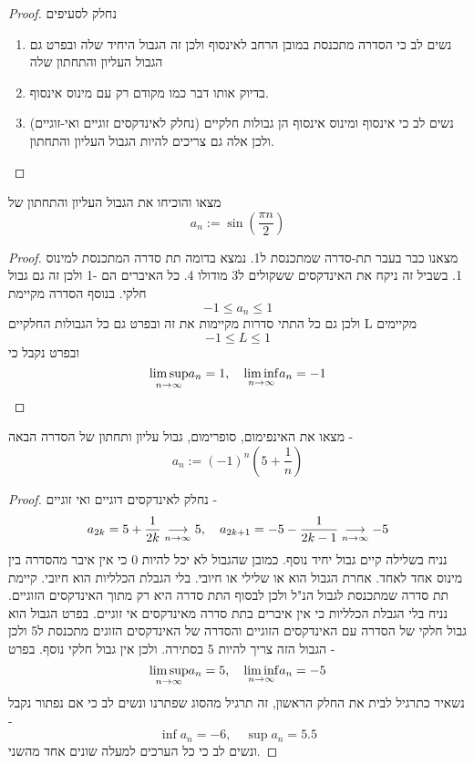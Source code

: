\documentclass{article}
\begin{document}
\begin{proof}
נחלק לסעיפים
\newline
\begin{enumerate}
\item נשים לב כי הסדרה מתכנסת במובן הרחב לאינסוף ולכן זה הגבול היחיד שלה ובפרט גם הגבול העליון והתחתון שלה
\item בדיוק אותו דבר כמו מקודם רק עם מינוס אינסוף.
\item נשים לב כי אינסוף ומינוס אינסוף הן גבולות חלקיים (נחלק לאינדקסים זוגיים ואי-זוגיים) ולכן אלה גם צריכים להיות הגבול העליון והתחתון. 
\end{enumerate}
\end{proof}

\begin{exercise}
מצאו והוכיחו את הגבול העליון והתחתון של 
\[a_n:=\sin\left(\frac{\pi n}{2}\right)\]
\end{exercise}

\begin{proof}
מצאנו כבר בעבר תת-סדרה שמתכנסת ל1. נמצא בדומה תת סדרה המתכנסת למינוס 1. בשביל זה ניקח את האינדקסים ששקולים ל3 מודולו 4. כל האיברים הם -1 ולכן זה גם גבול חלקי. בנוסף הסדרה מקיימת
\[-1\leq a_n\leq 1\]
ולכן גם כל התתי סדרות מקיימות את זה ובפרט גם כל הגבולות החלקיים L מקיימים 
\[-1\leq L\leq 1\]
ובפרט נקבל כי
\[\underset{n\rightarrow\infty}{\limsup} a_n = 1,\quad \underset{n\rightarrow\infty}{\liminf} a_n = -1\]
\end{proof}

\begin{exercise}
מצאו את האינפימום, סופרימום, גבול עליון ותחתון של הסדרה הבאה -
\[a_n:=(-1)^n \left(5+\frac{1}{n}\right)\]
\end{exercise}

\begin{proof}
נחלק לאינדקסים דוגיים ואי זוגיים - 
\[a_{2k} = 5+\frac{1}{2k}\underset{n\rightarrow\infty}{\longrightarrow} 5, \quad a_{2k+1}=-5-\frac{1}{2k-1}\underset{n\rightarrow\infty}{\longrightarrow}-5\]
נניח בשלילה קיים גבול יחיד נוסף. כמובן שהגבול לא יכל להיות 0 כי אין איבר מהסדרה בין מינוס אחד לאחד. אחרת הגבול הוא או שלילי או חיובי. בלי הגבלת הכלליות הוא חיובי. קיימת תת סדרה שמתכנסת לגבול הנ"ל ולכן לבסוף התת סדרה היא רק מתוך האינדקסים הזוגיים. נניח בלי הגבלת הכלליות כי אין איברים בתת סדרה מאינדקסים אי זוגיים. בפרט הגבול הוא גבול חלקי של הסדרה עם האינדקסים הזוגיים והסדרה של האינדקסים הזוגים מתכנסת ל5 ולכן הגבול הזה צריך להיות 5 בסתירה. ולכן אין גבול חלקי נוסף. בפרט -
\[\underset{n\rightarrow\infty}{\limsup} a_n=5,\quad \underset{n\rightarrow\infty}{\liminf} a_n = -5\]
נשאיר כתרגיל לבית את החלק הראשון, זה תרגיל מהסוג שפתרנו ונשים לב כי אם נפתור נקבל - 
\[\inf a_n = -6,\quad \sup a_n = 5.5\]
ונשים לב כי כל הערכים למעלה שונים אחד מהשני.
\end{proof}
\end{document}
